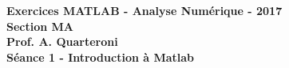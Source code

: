 \begin{center}
  \textbf{Exercices \textsc{MATLAB} - Analyse Numérique - 2017 \\
  Section MA \\
  Prof. A. Quarteroni \\
  Séance 1 - Introduction à Matlab}
\end{center}


\vspace{10mm}

\begin{ex}

\end{ex}

\begin{sol}

\end{sol}

\begin{ex}

\end{ex}

\begin{sol}

\end{sol}

\begin{ex}

\end{ex}

\begin{sol}

\end{sol}

\begin{ex}

\end{ex}

\begin{sol}

\end{sol}

\begin{ex}

\end{ex}

\begin{sol}

\end{sol}


